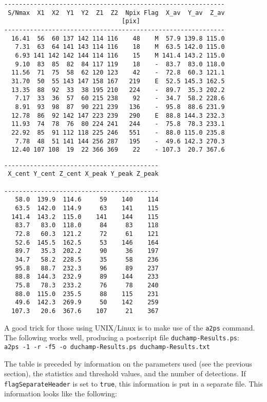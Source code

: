 {\begin{verbatim}
------------------------------------------------------------
 S/Nmax  X1  X2  Y1  Y2  Z1  Z2  Npix Flag  X_av  Y_av  Z_av
                                [pix]                       
------------------------------------------------------------
  16.41  56  60 137 142 114 116    48    M  57.9 139.8 115.0
   7.31  63  64 141 143 114 116    18    M  63.5 142.0 115.0
   6.93 141 142 142 144 114 116    15    M 141.4 143.2 115.0
   9.10  83  85  82  84 117 119    18    -  83.7  83.0 118.0
  11.56  71  75  58  62 120 123    42    -  72.8  60.3 121.1
  31.70  50  55 143 147 158 167   219    E  52.5 145.3 162.5
  13.35  88  92  33  38 195 210   224    -  89.7  35.3 202.2
   7.17  33  36  57  60 215 238    92    -  34.7  58.2 228.6
   8.91  93  98  87  90 221 239   136    -  95.8  88.6 231.9
  12.78  86  92 142 147 223 239   290    E  88.8 144.3 232.3
  11.93  74  78  76  80 224 241   244    -  75.8  78.3 233.1
  22.92  85  91 112 118 225 246   551    -  88.0 115.0 235.8
   7.78  48  51 141 144 256 287   195    -  49.6 142.3 270.3
  12.40 107 108  19  22 366 369    22    - 107.3  20.7 367.6
\end{verbatim}
\newpage
\begin{verbatim}
------------------------------------------
 X_cent Y_cent Z_cent X_peak Y_peak Z_peak
                                          
------------------------------------------
   58.0  139.9  114.6     59    140    114
   63.5  142.0  114.9     63    141    115
  141.4  143.2  115.0    141    144    115
   83.7   83.0  118.0     84     83    118
   72.8   60.3  121.2     72     61    121
   52.6  145.5  162.5     53    146    164
   89.7   35.3  202.2     90     36    197
   34.7   58.2  228.5     35     58    236
   95.8   88.7  232.3     96     89    237
   88.8  144.3  232.9     89    144    233
   75.8   78.3  233.2     76     78    240
   88.0  115.0  235.5     88    115    231
   49.6  142.3  269.9     50    142    259
  107.3   20.6  367.6    107     21    367
\end{verbatim}
}

A good trick for those using UNIX/Linux is to make use of the
\texttt{a2ps} command. The following works well, producing a
postscript file \texttt{duchamp-Results.ps}:
\\\verb|a2ps -1 -r -f5 -o duchamp-Results.ps duchamp-Results.txt|

The table is preceded by information on the parameters used (see the
previous section), the statistics and threshold values, and the number
of detections. If \texttt{flagSeparateHeader} is set to \texttt{true},
this information is put in a separate file. This information looks
like the following:

